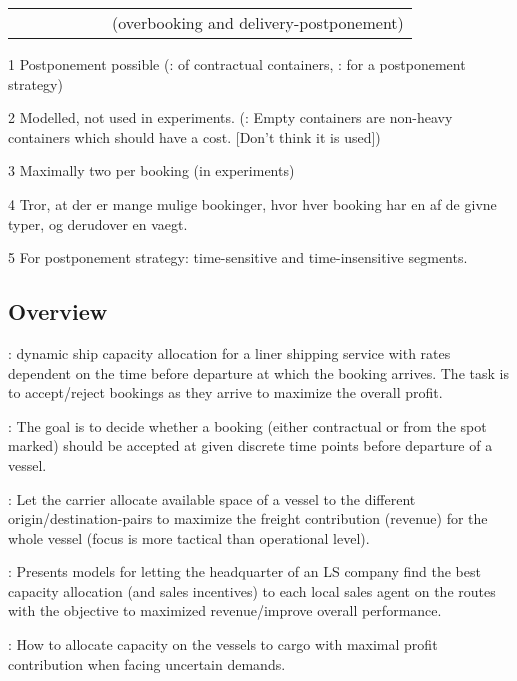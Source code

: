 \begin{sidewaystable}[htbp]
\begin{scriptsize}
\begin{threeparttable}
\begin{tabular}{l|llllll}
					&						&			&			& 				&										& (overbooking and delivery-postponement)\\
\end{tabular}
\begin{tablenotes}\footnotesize
\item[1] Postponement possible (\citet{Lee07}: of contractual containers, \citet{Wang19b}: for a postponement strategy)
\item[2] Modelled, not used in experiments. (\citet{Bingzhou08}: Empty containers are non-heavy containers which should have a cost. [Don’t think it is used])
\item[3] Maximally two per booking (in experiments)
\item[4] Tror, at der er mange mulige bookinger, hvor hver booking har en af de givne typer, og derudover en vaegt.
\item[5] For postponement strategy: time-sensitive and time-insensitive segments.
\end{tablenotes}
\end{threeparttable}
\end{scriptsize}
\end{sidewaystable}

\subsection{Overview}
\citet{Maragos94}: dynamic ship capacity allocation for a liner shipping service with rates dependent on the time before departure at which the booking arrives. The task is to accept/reject bookings as they arrive to maximize the overall profit. 

\citet{Lee07}: The goal is to decide whether a booking (either contractual or from the spot marked) should be accepted at given discrete time points before departure of a vessel.   

\citet{Ting04}: Let the carrier allocate available space of a vessel to the different origin/destination-pairs to maximize the freight contribution (revenue) for the whole vessel (focus is more tactical than operational level). 

\citet{Demirag07}: Presents models for letting the headquarter of an LS company find the best capacity allocation (and sales incentives) to each local sales agent on the routes with the objective to maximized revenue/improve overall performance.

\citet{Xianzhi07}: How to allocate capacity on the vessels to cargo with maximal profit contribution when facing uncertain demands.


